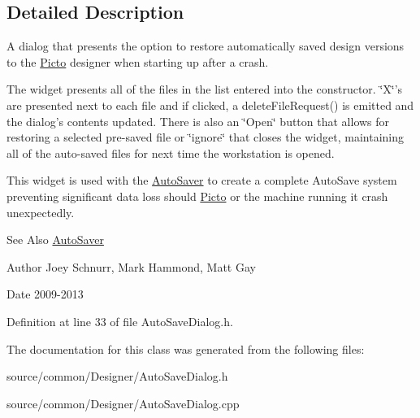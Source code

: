 \subsection{Detailed Description}
A dialog that presents the option to restore automatically saved design versions to the \hyperlink{namespace_picto}{Picto} designer when starting up after a crash. 

The widget presents all of the files in the list entered into the constructor. \char`\"{}\-X\char`\"{}'s are presented next to each file and if clicked, a delete\-File\-Request() is emitted and the dialog's contents updated. There is also an \char`\"{}\-Open\char`\"{} button that allows for restoring a selected pre-\/saved file or \char`\"{}ignore\char`\"{} that closes the widget, maintaining all of the auto-\/saved files for next time the workstation is opened.

This widget is used with the \hyperlink{class_picto_1_1_auto_saver}{Auto\-Saver} to create a complete Auto\-Save system preventing significant data loss should \hyperlink{namespace_picto}{Picto} or the machine running it crash unexpectedly. \begin{DoxySeeAlso}{See Also}
\hyperlink{class_picto_1_1_auto_saver}{Auto\-Saver} 
\end{DoxySeeAlso}
\begin{DoxyAuthor}{Author}
Joey Schnurr, Mark Hammond, Matt Gay 
\end{DoxyAuthor}
\begin{DoxyDate}{Date}
2009-\/2013 
\end{DoxyDate}


Definition at line 33 of file Auto\-Save\-Dialog.\-h.



The documentation for this class was generated from the following files\-:\begin{DoxyCompactItemize}
\item 
source/common/\-Designer/Auto\-Save\-Dialog.\-h\item 
source/common/\-Designer/Auto\-Save\-Dialog.\-cpp\end{DoxyCompactItemize}
